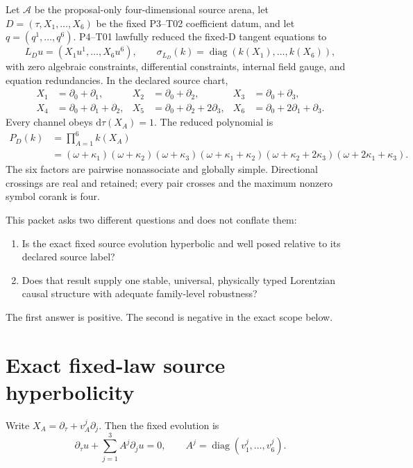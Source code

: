 \documentclass[11pt]{article}
\newcommand{\A}{\mathcal A}
\newcommand{\dd}{\mathrm d}
\newcommand{\sigmaL}{\sigma_{L_D}}
\begin{document}
Let $\A$ be the proposal-only four-dimensional source arena, let
$D=(\tau,X_1,\ldots,X_6)$ be the fixed P3--T02 coefficient datum, and let
$q=(q^1,\ldots,q^6)$.  P4--T01 lawfully reduced the fixed-D tangent equations
to
\begin{equation}
 L_Du=(X_1u^1,\ldots,X_6u^6),
 \qquad
 \sigmaL(k)=\operatorname{diag}(k(X_1),\ldots,k(X_6)),
 \label{eq:fixed}
\end{equation}
with zero algebraic constraints, differential constraints, internal field
gauge, and equation redundancies.  In the declared source chart,
\begin{align}
 X_1&=\partial_0+\partial_1,&
 X_2&=\partial_0+\partial_2,&
 X_3&=\partial_0+\partial_3,\nonumber\\
 X_4&=\partial_0+\partial_1+\partial_2,&
 X_5&=\partial_0+\partial_2+2\partial_3,&
 X_6&=\partial_0+2\partial_1+\partial_3.
 \label{eq:vectors}
\end{align}
Every channel obeys $\dd\tau(X_A)=1$.  The reduced polynomial is
\begin{align}
 P_D(k)&=\prod_{A=1}^{6}k(X_A)\nonumber\\
 &= (\omega+\kappa_1)(\omega+\kappa_2)(\omega+\kappa_3)
 (\omega+\kappa_1+\kappa_2)
 (\omega+\kappa_2+2\kappa_3)
 (\omega+2\kappa_1+\kappa_3).
 \label{eq:poly}
\end{align}
The six factors are pairwise nonassociate and globally simple.  Directional
crossings are real and retained; every pair crosses and the maximum nonzero
symbol corank is four.

This packet asks two different questions and does not conflate them:
\begin{enumerate}[leftmargin=*]
  \item Is the exact fixed source evolution hyperbolic and well posed relative
        to its declared source label?
  \item Does that result supply one stable, universal, physically typed
        Lorentzian causal structure with adequate family-level robustness?
\end{enumerate}
The first answer is positive.  The second is negative in the exact scope below.

\section{Exact fixed-law source hyperbolicity}

Write $X_A=\partial_\tau+v_A^j\partial_j$.  Then the fixed evolution is
\begin{equation}
 \partial_\tau u+\sum_{j=1}^{3}A^j\partial_j u=0,
 \qquad
 A^j=\operatorname{diag}(v_1^j,\ldots,v_6^j).
 \label{eq:evolution}
\end{equation}
\end{document}
